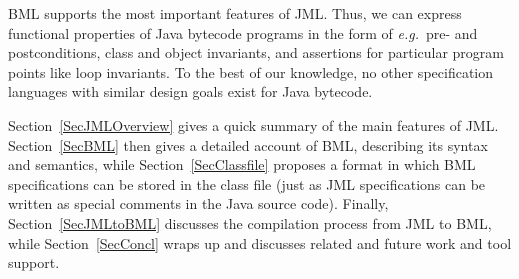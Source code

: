 BML supports the most important features of JML. Thus, we can express
functional properties of Java bytecode programs in the form of
\emph{e.g.}\ pre- and postconditions, class and object invariants, and
assertions for particular program points like loop invariants. To the
best of our knowledge, no other specification languages with similar
design goals exist for Java bytecode.

Section~\ref{SecJMLOverview} gives a quick summary of the main
features of JML. Section~\ref{SecBML} then gives a detailed account of
BML, describing its syntax and semantics, while
Section~\ref{SecClassfile} proposes a format in which BML
specifications can be stored in the class file (just as JML
specifications can be written as special comments in the Java source
code). Finally, Section~\ref{SecJMLtoBML} discusses the compilation
process from JML to BML, while Section~\ref{SecConcl} wraps up and
discusses related and future work and tool support.



